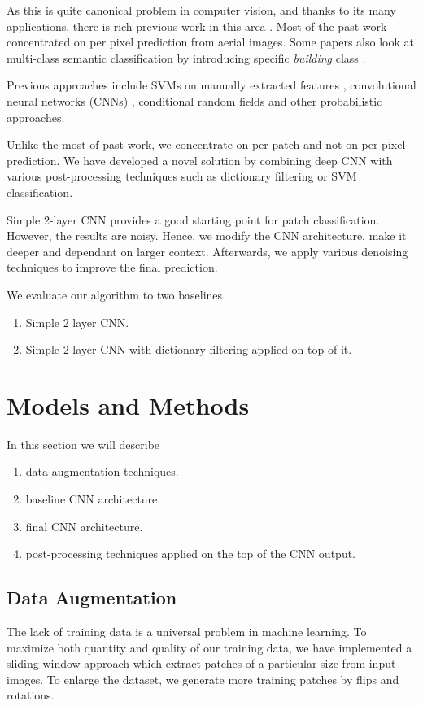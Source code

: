\documentclass[10pt,conference,compsocconf]{IEEEtran}
\begin{document}
As this is quite canonical problem in computer vision, and thanks to its many applications, there is rich previous work in this area \cite{Huang.2002} \cite{MnihThesis.2013} \cite{Long.2014} \cite{Montoya.2015} \cite{Saito.2015}. Most of the past work concentrated on per pixel prediction from aerial images. Some papers also look at multi-class semantic classification by introducing specific \textit{building} class \cite{Saito.2015}. 

Previous approaches include SVMs on manually extracted features \cite{Huang.2002}, convolutional neural networks (CNNs) \cite{Long.2014} \cite{Saito.2015}, conditional random fields \cite{Montoya.2015} and other probabilistic approaches.

Unlike the most of past work, we concentrate on per-patch and not on per-pixel prediction. We have developed a novel solution by combining deep CNN with various post-processing techniques such as dictionary filtering or SVM classification.

Simple 2-layer CNN provides a good starting point for patch classification.  However, the results are noisy. Hence, we modify the CNN architecture, make it deeper and dependant on larger context. Afterwards, we apply various denoising techniques to improve the final prediction. 

We evaluate our algorithm to two baselines
\begin{enumerate}
	\item Simple 2 layer CNN.
	\item Simple 2 layer CNN with dictionary filtering applied on top of it.
\end{enumerate}


\section{Models and Methods}
\label{sec:MM}
In this section we will describe
\begin{enumerate}
	\item data augmentation techniques.
	\item baseline CNN architecture.
	\item final CNN architecture.
	\item post-processing techniques applied on the top of the CNN output.
\end{enumerate}

\subsection{Data Augmentation}
\label{subsec:preprocessing}
The lack of training data is a universal problem in machine learning. To maximize both quantity and quality of our training data, we have implemented a sliding window approach which extract patches of a particular size from input images. To enlarge the dataset, we generate more training patches by flips and rotations.
\end{document}

